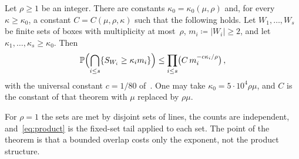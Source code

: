 \documentclass[11pt,letterpaper]{article}
\begin{document}
\begin{theorem}
\label{thm:product}
Let $\rho\ge1$ be an integer. There are constants $\kappa_0=\kappa_0(\mu,\rho)$ and, for every $\kappa\ge\kappa_0$, a constant $C=C(\mu,\rho,\kappa)$ such that the following holds. Let $W_1,\dots,W_s$ be finite sets of boxes with multiplicity at most~$\rho$, $m_i\coloneqq\lvert W_i\rvert\ge2$, and let $\kappa_1,\dots,\kappa_s\ge\kappa_0$. Then
\begin{equation}
\label{eq:product}
  \P\Bigl(\bigcap_{i\le s}\{S_{W_i}\ge\kappa_im_i\}\Bigr)\le\prod_{i\le s}\bigl(C\,m_i^{-c\kappa_i/\rho}\bigr)\,,
\end{equation}
with the universal constant $c=1/80$ of~\cite[Theorem~2.1]{SC26}. One may take $\kappa_0=5\cdot10^4\rho\mu$, and $C$ is the constant of that theorem with $\mu$ replaced by $\rho\mu$.
\end{theorem}

For $\rho=1$ the sets are met by disjoint sets of lines, the counts are independent, and~\eqref{eq:product} is the fixed-set tail applied to each set. The point of the theorem is that a bounded overlap costs only the exponent, not the product structure.
\end{document}
